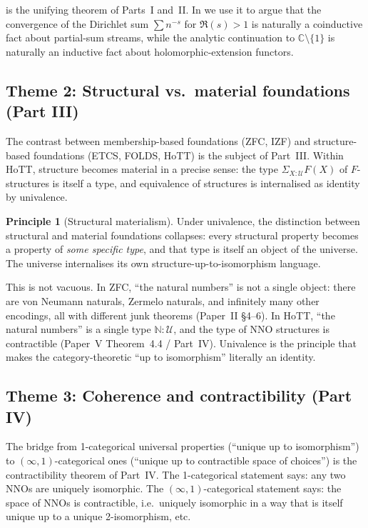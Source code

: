 \documentclass[12pt]{article}
\theoremstyle{definition}
\newtheorem{principle}[theorem]{Principle}
\theoremstyle{remark}
\newcommand{\Type}{\mathcal{U}}
\newcommand{\N}{\mathbb{N}}
\begin{document}
 is the unifying theorem of Parts~I and~II\@. In
 we use it to argue that the convergence of the
Dirichlet sum $\sum n^{-s}$ for $\Re(s) > 1$ is naturally a coinductive
fact about partial-sum streams, while the analytic continuation to
$\mathbb{C} \setminus \{1\}$ is naturally an inductive fact about
holomorphic-extension functors.

\subsection{Theme 2: Structural vs.\ material foundations (Part III)}

The contrast between membership-based foundations (ZFC, IZF) and
structure-based foundations (ETCS, FOLDS, HoTT) is the subject of
Part~III\@. Within HoTT, structure becomes material in a precise sense:
the type $\Sigma_{X : \Type} F(X)$ of $F$-structures is itself a type,
and equivalence of structures is internalised as identity by univalence.

\begin{principle}[Structural materialism]\label{prin:strucMaterial}
Under univalence, the distinction between structural and material
foundations collapses: every structural property becomes a property of
\emph{some specific type}, and that type is itself an object of the
universe. The universe internalises its own structure-up-to-isomorphism
language.
\end{principle}

This is not vacuous. In ZFC, ``the natural numbers'' is not a single
object: there are von Neumann naturals, Zermelo naturals, and infinitely
many other encodings, all with different junk theorems
(Paper~II \S 4--6). In HoTT, ``the natural numbers'' is a single type
$\N : \Type$, and the type of NNO structures is contractible (Paper~V
Theorem~4.4 / Part~IV). Univalence is the principle that makes the
category-theoretic ``up to isomorphism'' literally an identity.

\subsection{Theme 3: Coherence and contractibility (Part IV)}

The bridge from 1-categorical universal properties (``unique up to
isomorphism'') to $(\infty,1)$-categorical ones (``unique up to
contractible space of choices'') is the contractibility theorem of
Part~IV\@. The 1-categorical statement says: any two NNOs are uniquely
isomorphic. The $(\infty,1)$-categorical statement says: the space of
NNOs is contractible, i.e.\ uniquely isomorphic in a way that is itself
unique up to a unique 2-isomorphism, etc.
\end{document}
